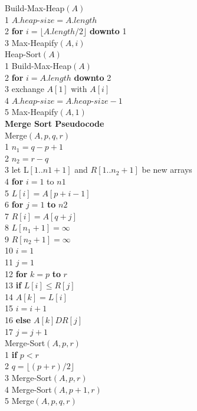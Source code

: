 \documentclass[a4paper]{article}
\begin{document}
    Build-Max-Heap$(A)$ \\
    1 $A.heap$-$size = A.length$ \\
    2 \textbf{for} $i = \lfloor A.length/2 \rfloor$ \textbf{downto} 1 \\
    3 \phantom{hell}Max-Heapify$(A, i)$ \\

    Heap-Sort$(A)$ \\
    1 Build-Max-Heap$(A)$ \\
    2 \textbf{for} $i = A.length$ \textbf{downto} 2 \\
    3 \phantom{hell}exchange $A[1]$ with $A[i]$ \\
    4 \phantom{hell}$A.heap$-$size = A.heap$-$size - 1$ \\
    5 \phantom{hell}Max-Heapify$(A, 1)$ \\
    
    \newpage
    \textbf{Merge Sort Pseudocode} \\
    Merge$(A, p, q, r)$ \\
    1  $n_{1} = q-p+1$ \\
    2  $n_{2} = r-q$ \\
    3  let L$[1..n{1}+1]$ and $R[1..n_{2}+1]$ be new arrays \\
    4  \textbf{for} $i = 1$ to $n{1}$ \\
    5  \phantom{hell}$L[i] = A[p+i-1]$ \\
    6  \textbf{for} $j = 1$ \textbf{to} $n{2}$ \\
    7  \phantom{hell}$R[i] = A[q+j]$ \\
    8  $L[n_{1}+1] = \infty$ \\
    9  $R[n_{2}+1] = \infty$ \\
    10 $i = 1$ \\
    11 $j = 1$ \\
    12 \textbf{for} $k = p$ \textbf{to} $r$ \\
    13 \phantom{hell}\textbf{if} $L[i] \leq R[j]$ \\
    14 \phantom{hellhell}$A[k] = L[i]$ \\
    15 \phantom{hellhell}$i=i+1$ \\
    16 \phantom{hell}\textbf{else} $A[k] D R[j]$ \\
    17 \phantom{hellhell}$j=j+1$ \\

    Merge-Sort$(A, p, r)$ \\
    1 \textbf{if} $p<r$ \\
    2   \phantom{hell}$q = \lfloor (p + r)/2\rfloor $ \\
    3   \phantom{hell}Merge-Sort$(A, p, r)$ \\
    4   \phantom{hell}Merge-Sort$(A, p+1, r)$ \\
    5   \phantom{hell}Merge$(A, p, q, r)$ \\
\end{document}
